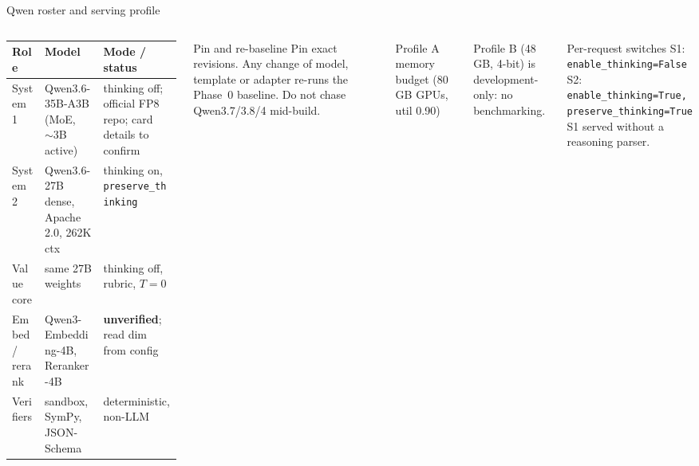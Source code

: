 \documentclass[aspectratio=169,10pt]{beamer}
\begin{document}
\begin{frame}{Qwen roster and serving profile}
\begin{columns}[T]
\scriptsize
\begin{tabular}{@{}p{1.5cm}p{2.3cm}p{2.7cm}@{}}
\toprule
Role & Model & Mode / status\\\midrule
System 1 & Qwen3.6-35B-A3B (MoE, ${\sim}3$B active) & thinking off; official FP8 repo; card details to confirm\\
System 2 & Qwen3.6-27B dense, Apache 2.0, 262K ctx & thinking on, \texttt{preserve\_thinking}\\
Value core & same 27B weights & thinking off, rubric, $T{=}0$\\
Embed / rerank & Qwen3-Embedding-4B, Reranker-4B & \textbf{unverified}; read dim from config\\
Verifiers & sandbox, SymPy, JSON-Schema & deterministic, non-LLM\\\bottomrule
\end{tabular}

\vspace{4pt}
\begin{alertblock}{Pin and re-baseline}
Pin exact revisions. Any change of model, template or adapter re-runs the Phase~0 baseline. Do not chase Qwen3.7/3.8/4 mid-build.
\end{alertblock}
\centering\scriptsize Profile A memory budget (80\,GB GPUs, util 0.90)\\[2pt]

\vspace{4pt}\scriptsize
Profile B (48\,GB, 4-bit) is development-only: no benchmarking.\\[3pt]
\begin{exampleblock}{Per-request switches}
\scriptsize S1: \texttt{enable\_thinking=False}\\
S2: \texttt{enable\_thinking=True, preserve\_thinking=True}\\
S1 served without a reasoning parser.
\end{exampleblock}
\end{columns}
\end{frame}
\end{document}
